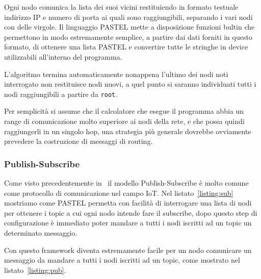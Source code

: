 \documentclass[]{article}
\begin{document}
Ogni nodo comunica la lista dei suoi vicini restituiendo in formato testuale indirizzo IP e numero di porta ai quali sono raggiungibili, separando i vari nodi con delle virgole. Il linguaggio PASTEL mette a disposizione funzioni bultin che permettono in modo estremamente semplice, a partire dai dati forniti in questo formato, di ottenere una lista PASTEL e convertire tutte le stringhe in device utilizzabili all'interno del programma.

L'algoritmo termina automaticamente nonappena l'ultimo dei nodi noti interrogato non restituisce nodi nuovi, a quel punto si saranno individuati tutti i nodi raggiungibili a partire da \texttt{root}.

Per semplicità si assume che il calcolatore che esegue il programma abbia un range di comunicazione molto superiore ai nodi della rete, e che possa quindi raggiungerli in un singolo hop, una strategia più generale dovrebbe ovviamente prevedere la costruzione di messaggi di routing.



\subsubsection{Publish-Subscribe}\label{subsubsection:pub-sub}

Come visto precedentemente in~\cite{tandale2017empirical} il modello Publish-Subscribe è molto comune come protocollo di comunicazione nel campo IoT. Nel listato~\ref{listing:sub} mostriamo come PASTEL permetta con facilità di interrogare una lista di nodi per ottenere i topic a cui ogni nodo intende fare il subscribe, dopo questo step di configurazione è immediato poter mandare a tutti i nodi iscritti ad un topic un determinato messaggio.





Con questo framework diventa estremamente facile per un nodo comunicare un messaggio da mandare a tutti i nodi iscritti ad un topic, come mostrato nel listato~\ref{listing:pub}.
\end{document}
